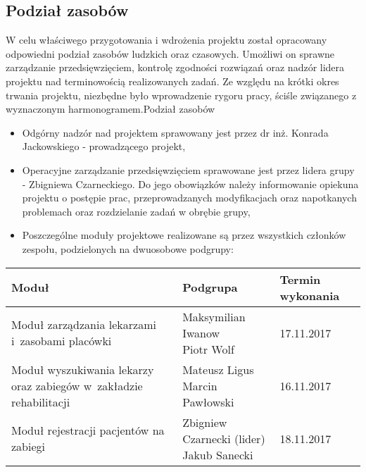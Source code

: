 \subsection{Podział zasobów}

W celu właściwego przygotowania i wdrożenia projektu został opracowany odpowiedni podział zasobów ludzkich oraz czasowych. Umożliwi on sprawne zarządzanie przedsięwzięciem, kontrolę zgodności rozwiązań oraz nadzór lidera projektu nad terminowością realizowanych zadań. Ze względu na krótki okres trwania projektu, niezbędne było wprowadzenie rygoru pracy, ściśle związanego z wyznaczonym harmonogramem.Podział zasobów

\begin{itemize}
	\item Odgórny nadzór nad projektem sprawowany jest przez dr inż. Konrada Jackowskiego - prowadzącego projekt,
	\item Operacyjne zarządzanie przedsięwzięciem sprawowane jest przez lidera grupy - Zbigniewa Czarneckiego. Do jego obowiązków należy informowanie opiekuna projektu o postępie prac, przeprowadzanych modyfikacjach oraz napotkanych problemach oraz rozdzielanie zadań w obrębie grupy,
	\item Poszczególne moduły projektowe realizowane są przez wszystkich członków zespołu, podzielonych na dwuosobowe podgrupy: 
\end{itemize}

\begin{tabular}{|p{7.7cm}|l|l|}
	\hline
	Moduł & Podgrupa & Termin wykonania \tabularnewline \hline
	Moduł zarządzania lekarzami i~zasobami placówki & \makecell[l]{Maksymilian Iwanow \\ Piotr Wolf} & 17.11.2017 \tabularnewline \hline
	Moduł wyszukiwania lekarzy oraz zabiegów w~zakładzie rehabilitacji & \makecell[l]{Mateusz Ligus \\ Marcin Pawłowski} & 16.11.2017 \tabularnewline \hline
	Moduł rejestracji pacjentów na zabiegi & \makecell[l]{Zbigniew Czarnecki (lider) \\ Jakub Sanecki} & 18.11.2017 \tabularnewline \hline
\end{tabular}

